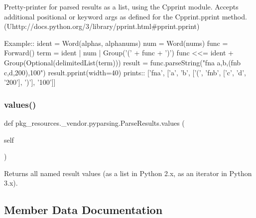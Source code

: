 \begin{DoxyVerb}Pretty-printer for parsed results as a list, using the C{pprint} module.
Accepts additional positional or keyword args as defined for the 
C{pprint.pprint} method. (U{http://docs.python.org/3/library/pprint.html#pprint.pprint})

Example::
    ident = Word(alphas, alphanums)
    num = Word(nums)
    func = Forward()
    term = ident | num | Group('(' + func + ')')
    func <<= ident + Group(Optional(delimitedList(term)))
    result = func.parseString("fna a,b,(fnb c,d,200),100")
    result.pprint(width=40)
prints::
    ['fna',
     ['a',
      'b',
      ['(', 'fnb', ['c', 'd', '200'], ')'],
      '100']]
\end{DoxyVerb}
 \mbox{\label{classpkg__resources_1_1__vendor_1_1pyparsing_1_1ParseResults_afb27b1e16010219f2a19c5605f5f1163}} 
\subsubsection{\texorpdfstring{values()}{values()}}
{\footnotesize\ttfamily def pkg\+\_\+resources.\+\_\+vendor.\+pyparsing.\+Parse\+Results.\+values (\begin{DoxyParamCaption}\item[{}]{self }\end{DoxyParamCaption})}

\begin{DoxyVerb}Returns all named result values (as a list in Python 2.x, as an iterator in Python 3.x).\end{DoxyVerb}
 

\subsection{Member Data Documentation}
\mbox{\label{classpkg__resources_1_1__vendor_1_1pyparsing_1_1ParseResults_ae7f3ff5dd36980859282eb575c537f7d}} 
